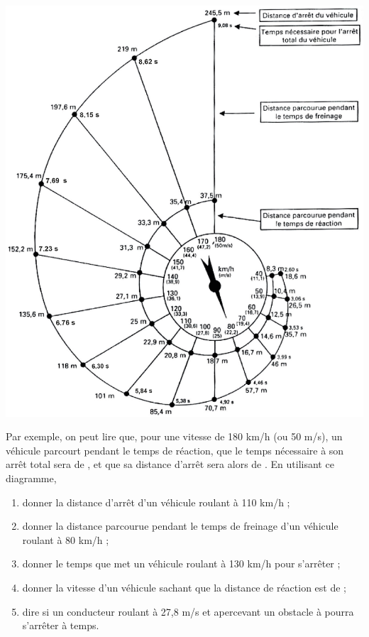 \begin{exercice}[CRPE 2018 G1]
\begin{enumerate}
\begin{center}
            \includegraphics[width=15.cm]{Organisation_gestion_donnees/Images/D5_ex_escargot_arret}
         \end{center} \smallskip
         Par exemple, on peut lire que, pour une vitesse de 180 km/h (ou 50 m/s), un véhicule parcourt  pendant le temps de réaction, que le temps nécessaire à son arrêt total sera de , et que sa distance d’arrêt sera alors de . En utilisant ce diagramme,
   \begin{enumerate}
      \item donner la distance d’arrêt d’un véhicule roulant à 110 km/h ;
      \item donner la distance parcourue pendant le temps de freinage d’un véhicule roulant à 80 km/h ;
      \item donner le temps que met un véhicule roulant à 130 km/h pour s’arrêter ;
      \item donner la vitesse d’un véhicule sachant que la distance de réaction est de  ;
      \item dire si un conducteur roulant à 27,8 m/s et apercevant un obstacle à  pourra s’arrêter à temps. \\ [-8mm]
      \end{enumerate}
   \end{enumerate}
\end{exercice}

